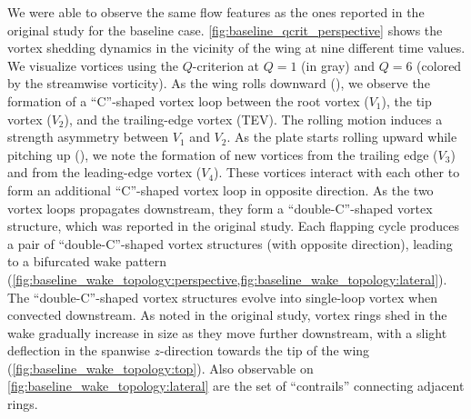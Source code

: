 We were able to observe the same flow features as the ones reported in the original study for the baseline case.
\cref{fig:baseline_qcrit_perspective} shows the vortex shedding dynamics in the vicinity of the wing at nine different time values.
We visualize vortices using the $Q$-criterion at $Q = 1$ (in gray) and $Q = 6$ (colored by the streamwise vorticity).
As the wing rolls downward (), we observe the formation of a ``C''-shaped vortex loop between the root vortex ($V_1$), the tip vortex ($V_2$), and the trailing-edge vortex (TEV).
The rolling motion induces a strength asymmetry between $V_1$ and $V_2$.
As the plate starts rolling upward while pitching up (), we note the formation of new vortices from the trailing edge ($V_3$) and from the leading-edge vortex ($V_4$).
These vortices interact with each other to form an additional ``C''-shaped vortex loop in opposite direction.
As the two vortex loops propagates downstream, they form a ``double-C''-shaped vortex structure, which was reported in the original study.
Each flapping cycle produces a pair of ``double-C''-shaped vortex structures (with opposite direction), leading to a bifurcated wake pattern (\cref{fig:baseline_wake_topology:perspective,fig:baseline_wake_topology:lateral}).
The ``double-C''-shaped vortex structures evolve into single-loop vortex when convected downstream.
As noted in the original study, vortex rings shed in the wake gradually increase in size as they move further downstream, with a slight deflection in the spanwise $z$-direction towards the tip of the wing (\cref{fig:baseline_wake_topology:top}).
Also observable on \cref{fig:baseline_wake_topology:lateral} are the set of ``contrails'' connecting adjacent rings.

